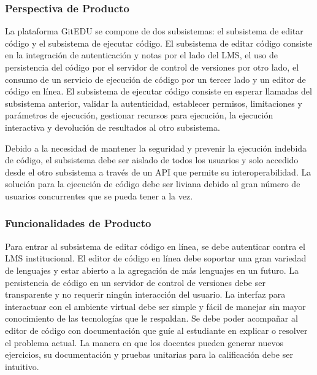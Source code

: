 \subsubsection{Perspectiva de Producto}
    
La plataforma GitEDU se compone de dos subsistemas: el subsistema de editar código y el subsistema de ejecutar código. El subsistema de editar código consiste en la integración de autenticación y notas por el lado del LMS, el uso de persistencia del código por el servidor de control de versiones por otro lado, el consumo de un servicio de ejecución de código por un tercer lado y un editor de código en línea. El subsistema de ejecutar código consiste en esperar llamadas del subsistema anterior, validar la autenticidad, establecer permisos, limitaciones y parámetros de ejecución, gestionar recursos para ejecución, la ejecución interactiva y devolución de resultados al otro subsistema.

Debido a la necesidad de mantener la seguridad y prevenir la ejecución indebida de código, el subsistema debe ser aislado de todos los usuarios y solo accedido desde el otro subsistema a través de un API que permite su interoperabilidad. La solución para la ejecución de código debe ser liviana debido al gran número de usuarios concurrentes que se pueda tener a la vez.

\subsubsection{Funcionalidades de Producto}
     
Para entrar al subsistema de editar código en línea, se debe autenticar contra el LMS  institucional. El editor de código en línea debe soportar una gran variedad de lenguajes y estar abierto a la agregación de más lenguajes en un futuro. La persistencia de código en un servidor de control de versiones debe ser transparente y no requerir ningún interacción del usuario. La interfaz para interactuar con el ambiente virtual debe ser simple y fácil de manejar sin mayor conocimiento de las tecnologías que le respaldan. Se debe poder acompañar al editor de código con documentación que guíe al estudiante en explicar o resolver el problema actual. La manera en que los docentes pueden generar nuevos ejercicios, su documentación y pruebas unitarias para la calificación debe ser intuitivo.

